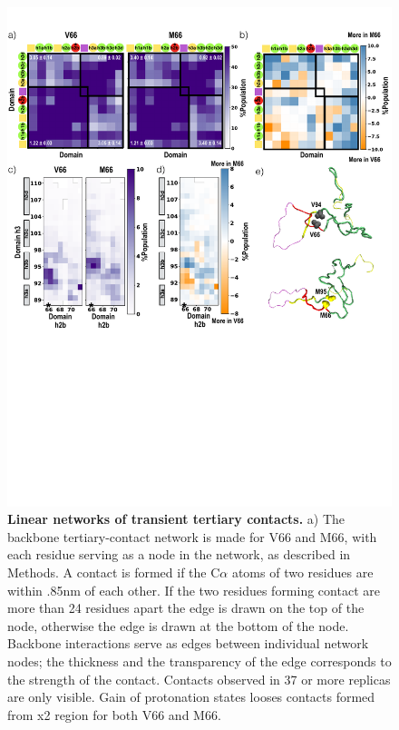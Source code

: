 \documentclass[journal=jacsat,manuscript=article]{achemso}
\begin{document}
\begin{figure}[!ht]
\includegraphics[scale=0.5,width=12cm,trim={0 0cm 0 0cm},clip]{../figures/fig4.pdf}
\caption{{\bf Linear networks of transient tertiary contacts.} a) The backbone tertiary-contact network is made for V66 and M66, with each residue serving as a node in the network, as described in Methods. A contact is formed if the C$\alpha$ atoms of two residues are within .85nm of each other. If the two residues forming contact are more than 24 residues apart the edge is drawn on the top of the node, otherwise the edge is drawn at the bottom of the node. Backbone interactions serve as edges between individual network nodes; the thickness  and the transparency of the edge corresponds to the strength of the contact. Contacts observed in 37 or more replicas are only visible.  Gain of protonation states looses contacts formed from x2 region for both V66 and M66.
 }
\label{fig4}
\end{figure}
\end{document}
